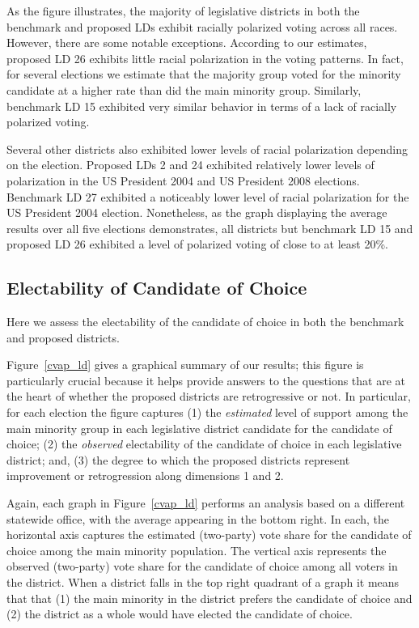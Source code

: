 \documentclass[12pt]{article}
\begin{document}
As the figure illustrates, the majority of legislative districts in
both the benchmark and proposed LDs exhibit racially polarized voting
across all races. However, there are some notable exceptions.
According to our estimates, proposed LD 26 exhibits little racial
polarization in the voting patterns. In fact, for several elections we
estimate that the majority group voted for the minority candidate at a
higher rate than did the main minority group. Similarly, benchmark LD
15 exhibited very similar behavior in terms of a lack of racially
polarized voting.

Several other districts also exhibited lower levels of racial polarization depending on the election. Proposed LDs 2 and 24 exhibited relatively lower levels of polarization in the US President 2004 and US President 2008 elections. Benchmark LD 27 exhibited a noticeably lower level of racial polarization for the US President 2004 election. Nonetheless, as the graph displaying the average results over all five elections demonstrates, all districts but benchmark LD 15 and proposed LD 26 exhibited a level of polarized voting of close to at least 20\%.

\subsection{Electability of Candidate of Choice}

Here we assess the electability of the candidate of choice in both the
benchmark and proposed districts.


Figure~\ref{cvap_ld} gives a graphical summary of our results; this
figure is particularly crucial because it helps provide answers to the
questions that are at the heart of whether the proposed districts are
retrogressive or not. In particular, for each election the figure
captures (1) the {\it estimated} level of support among the main
minority group in each legislative district candidate for the
candidate of choice; (2) the {\it observed} electability of the
candidate of choice in each legislative district; and, (3) the
degree to which the proposed districts represent improvement or
retrogression along dimensions 1 and 2.

Again, each graph in Figure~\ref{cvap_ld} performs an analysis based
on a different statewide office, with the average appearing in the
bottom right.  In each, the horizontal axis captures the estimated
(two-party) vote share for the candidate of choice among the main
minority population. The vertical axis represents the observed
(two-party) vote share for the candidate of choice among all voters in
the district.  When a district falls in the top right quadrant of a
graph it means that that (1) the main minority in the district prefers
the candidate of choice and (2) the district as a whole would have
elected the candidate of choice.
\end{document}
